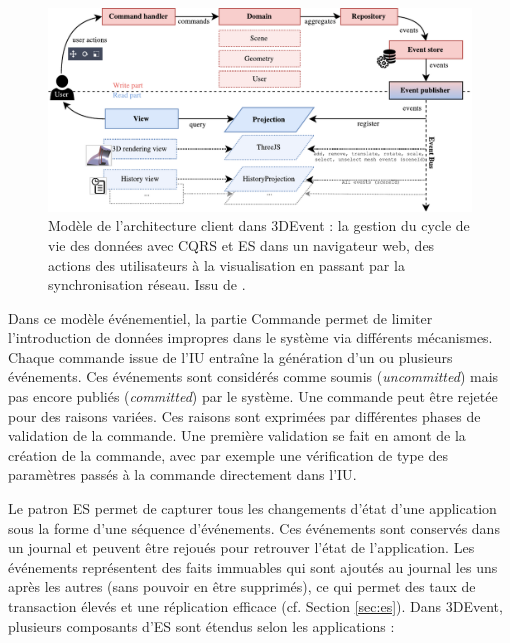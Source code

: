 \begin{figure}[h]
	\centering
	\includegraphics[width=\columnwidth]{eps/cqrs2.pdf}
	\caption[Modèle de l'architecture client dans 3DEvent]{Modèle de l'architecture 
		client dans 3DEvent : la gestion du cycle de vie des données avec 
		\gls{CQRS} 
		et \gls{ES} dans un navigateur web, des actions des utilisateurs à la visualisation 
		en passant par la synchronisation réseau. Issu de \cite{Desprat2017}.}
	\label{fig:cqrs-client}
\end{figure}


Dans ce modèle événementiel, la partie Commande permet de limiter l'introduction 
de données impropres dans le système via différents mécanismes. Chaque 
commande issue de l'\gls{IU} entraîne la génération d'un ou plusieurs événements. 
Ces événements sont considérés 
comme \og soumis\fg{} (\textit{uncommitted}) mais pas encore \og publiés\fg{} 
(\textit{committed}) par le système.
Une commande peut être rejetée pour des raisons variées. Ces raisons sont 
exprimées par différentes phases de validation de la commande.
Une première validation se fait en amont de la création de la commande, avec par 
exemple une vérification de type des paramètres passés à la commande directement
dans l'\gls{IU}.

Le patron \gls{ES} permet de capturer tous les changements d'état 
d'une application sous la forme d'une séquence d'événements. 
Ces événements sont conservés dans un journal et peuvent être 
rejoués pour retrouver l'état de l'application. 
Les événements représentent des faits immuables qui sont ajoutés au journal les
uns après les autres (sans pouvoir en être supprimés), ce qui permet des taux de 
transaction élevés et une réplication efficace (cf. Section \ref{sec:es}). 
Dans 3DEvent, plusieurs composants d'\gls{ES} sont étendus selon 
les applications :

